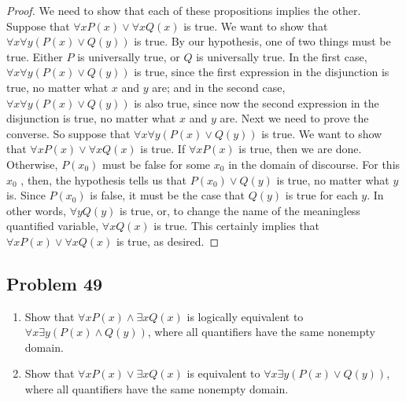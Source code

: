 \documentclass{article}
\begin{document}
\begin{proof}
We need to show that each of these propositions implies the other. Suppose that $\forall xP(x) \lor \forall xQ(x)$ is true. We want to show that $\forall x \forall y(P(x) \lor Q(y))$ is true. By our hypothesis, one of two things must be true. Either $P$ is universally true, or $Q$ is universally true. In the first case, $\forall x \forall y(P(x) \lor Q(y))$ is true, since the first expression in the disjunction is true, no matter what $x$ and $y$ are; and in the second case, $\forall x \forall y(P(x) \lor Q(y))$ is also true, since now the second expression in the disjunction is true, no matter what $x$ and $y$ are. Next we need to prove the converse. So suppose that $\forall x \forall y(P(x) \lor Q(y))$ is true. We want to show that $\forall xP(x) \lor \forall xQ(x)$ is true. If $\forall xP(x)$ is true, then we are done. Otherwise, $P(x_0)$ must be false for some $x_0$ in the domain of discourse. For this $x_0$ , then, the hypothesis tells us that $P(x_0) \lor Q(y)$ is true, no matter what $y$ is. Since $P(x_0)$ is false, it must be the case that $Q(y)$ is true for each $y$. In other words, $\forall yQ(y)$ is true, or, to change the name of the meaningless quantified variable, $\forall xQ(x)$ is true. This certainly implies that $\forall xP(x) \lor \forall xQ(x)$ is true, as desired.
\end{proof}

\clearpage
\subsection*{Problem 49}
\begin{enumerate}[leftmargin=16pt, topsep = 8pt]
\item Show that $\forall xP(x) \land \exists xQ(x)$ is logically equivalent to $\forall x \exists y(P(x) \land Q(y))$, where all quantifiers have the same nonempty domain.
\item Show that $\forall xP(x) \lor \exists xQ(x)$ is equivalent to $\forall x \exists y(P(x) \lor Q(y))$, where all quantifiers have the same nonempty domain.
\end{enumerate}
\end{document}
